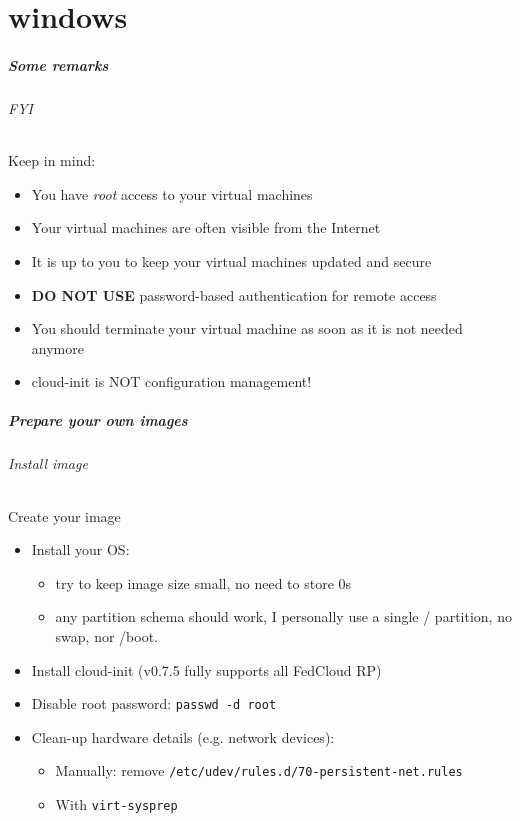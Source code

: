 \part{windows}

\begin{frame}[fragile]
  \frametitle{Some remarks}
  \framesubtitle{FYI}

  Keep in mind:
  \begin{itemize}
    \item You have \textit{root} access to your virtual machines
    \item Your virtual machines are often visible from the Internet
    \item It is up to you to keep your virtual machines updated and secure
    \item \textbf{DO NOT USE} password-based authentication for remote access
    \item You should terminate your virtual machine as soon as it is not
          needed anymore
    \item cloud-init is NOT configuration management!
  \end{itemize}

\end{frame}



\begin{frame}
  \frametitle{Prepare your own images}
  \framesubtitle{Install image}
    
  \begin{block}{Create your image}
    \begin{itemize}
        \item Install your OS:
        \begin{itemize}
            \item try to keep image size small, no need to store 0s
            \item any partition schema should work, I personally use a
                single / partition, no swap, nor /boot.
        \end{itemize}
        \item Install cloud-init (v0.7.5 fully supports all FedCloud RP)
        \item Disable root password: \texttt{passwd -d root}
        \item Clean-up hardware details (e.g. network devices):
        \begin{itemize}
            \item Manually: remove \texttt{/etc/udev/rules.d/70-persistent-net.rules}
            \item With \texttt{virt-sysprep}
        \end{itemize}
    \end{itemize}
  \end{block}
\end{frame}

